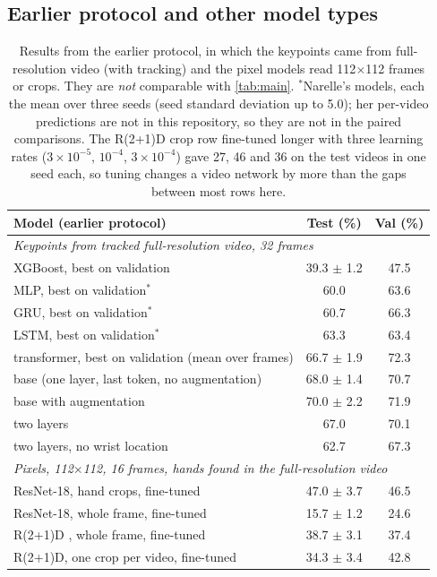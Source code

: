 \documentclass{article}
\begin{document}
\subsection{Earlier protocol and other model types}
\begin{table}[t]
\centering\small\setlength{\tabcolsep}{3pt}
\begin{tabular}{lcc}
\toprule
Model (earlier protocol) & Test (\%) & Val (\%) \\
\midrule
\multicolumn{3}{l}{\emph{Keypoints from tracked full-resolution video, 32 frames}} \\
XGBoost, best on validation                         & 39.3 $\pm$ 1.2 & 47.5 \\
MLP, best on validation$^\ast$                       & 60.0 & 63.6 \\
GRU, best on validation$^\ast$                       & 60.7 & 66.3 \\
LSTM, best on validation$^\ast$                      & 63.3 & 63.4 \\
transformer, best on validation (mean over frames)    & 66.7 $\pm$ 1.9 & 72.3 \\
\quad base (one layer, last token, no augmentation)   & 68.0 $\pm$ 1.4 & 70.7 \\
\quad base with augmentation                          & 70.0 $\pm$ 2.2 & 71.9 \\
\quad two layers                                      & 67.0 & 70.1 \\
\quad two layers, no wrist location                   & 62.7 & 67.3 \\
\midrule
\multicolumn{3}{l}{\emph{Pixels, 112$\times$112, 16 frames, hands found in the full-resolution video}} \\
ResNet-18, hand crops, fine-tuned                    & 47.0 $\pm$ 3.7 & 46.5 \\
ResNet-18, whole frame, fine-tuned                   & 15.7 $\pm$ 1.2 & 24.6 \\
R(2+1)D \citep{tran2018closer}, whole frame, fine-tuned & 38.7 $\pm$ 3.1 & 37.4 \\
R(2+1)D, one crop per video, fine-tuned              & 34.3 $\pm$ 3.4 & 42.8 \\
\bottomrule
\end{tabular}
\caption{Results from the earlier protocol, in which the keypoints came from full-resolution video (with tracking) and the
pixel models read 112$\times$112 frames or crops. They are \emph{not} comparable with \cref{tab:main}.
$^\ast$Narelle's models, each the mean over three seeds (seed standard deviation up to 5.0); her per-video
predictions are not in this repository, so they are not in the paired comparisons. The R(2+1)D crop row fine-tuned longer with three learning rates
($3\times10^{-5}$, $10^{-4}$, $3\times10^{-4}$) gave 27, 46 and 36 on the test videos in one seed each, so tuning
changes a video network by more than the gaps between most rows here.}
\label{tab:earlier}
\end{table}
\end{document}
